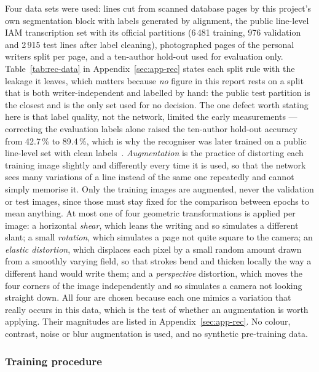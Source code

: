 Four data sets were used: lines cut from scanned database pages by this project's own segmentation block with labels generated by alignment, the public line-level IAM transcription set with its official partitions (6\,481 training, 976 validation and 2\,915 test lines after label cleaning), photographed pages of the personal writers split per page, and a ten-author hold-out used for evaluation only.
Table~\ref{tab:rec-data} in Appendix~\ref{sec:app-rec} states each split rule with the leakage it leaves, which matters because \emph{no} figure in this report rests on a split that is both writer-independent and labelled by hand: the public test partition is the closest and is the only set used for no decision.
The one defect worth stating here is that label quality, not the network, limited the early measurements --- correcting the evaluation labels alone raised the ten-author hold-out accuracy from 42.7\,\% to 89.4\,\%, which is why the recogniser was later trained on a public line-level set with clean labels~\cite{mamun2024}.
\emph{Augmentation} is the practice of distorting each training image slightly and differently every time it is used, so that the network sees many variations of a line instead of the same one repeatedly and cannot simply memorise it. Only the training images are augmented, never the validation or test images, since those must stay fixed for the comparison between epochs to mean anything. At most one of four geometric transformations is applied per image: a horizontal \emph{shear}, which leans the writing and so simulates a different slant; a small \emph{rotation}, which simulates a page not quite square to the camera; an \emph{elastic distortion}, which displaces each pixel by a small random amount drawn from a smoothly varying field, so that strokes bend and thicken locally the way a different hand would write them; and a \emph{perspective} distortion, which moves the four corners of the image independently and so simulates a camera not looking straight down. All four are chosen because each one mimics a variation that really occurs in this data, which is the test of whether an augmentation is worth applying. Their magnitudes are listed in Appendix~\ref{sec:app-rec}. No colour, contrast, noise or blur augmentation is used, and no synthetic pre-training data.


\subsubsection{Training procedure}

